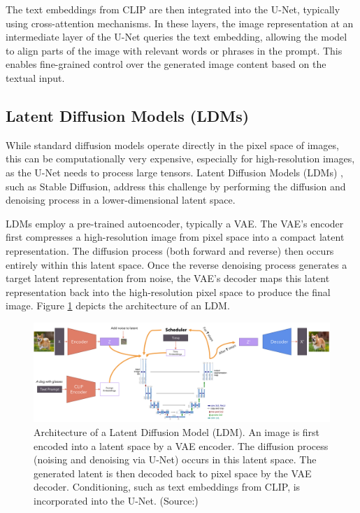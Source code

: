 The text embeddings from CLIP are then integrated into the U-Net, typically using cross-attention mechanisms. In these layers, the image representation at an intermediate layer of the U-Net queries the text embedding, allowing the model to align parts of the image with relevant words or phrases in the prompt. This enables fine-grained control over the generated image content based on the textual input.

\subsection{Latent Diffusion Models (LDMs)}\label{ssec:ldm}
While standard diffusion models operate directly in the pixel space of images, this can be computationally very expensive, especially for high-resolution images, as the U-Net needs to process large tensors. Latent Diffusion Models (LDMs) \cite{stablediffusion}, such as Stable Diffusion, address this challenge by performing the diffusion and denoising process in a lower-dimensional latent space.

LDMs employ a pre-trained autoencoder, typically a VAE. The VAE's encoder first compresses a high-resolution image from pixel space into a compact latent representation. The diffusion process (both forward and reverse) then occurs entirely within this latent space. Once the reverse denoising process generates a target latent representation from noise, the VAE's decoder maps this latent representation back into the high-resolution pixel space to produce the final image. Figure \ref{fig:ldm-architecture} depicts the architecture of an LDM.

\begin{figure}[h]
  \centering
  \includegraphics[width=\textwidth]{images/related-work/LDM-detailed.png}
  \caption{Architecture of a Latent Diffusion Model (LDM). An image is first encoded into a latent space by a VAE encoder. The diffusion process (noising and denoising via U-Net) occurs in this latent space. The generated latent is then decoded back to pixel space by the VAE decoder. Conditioning, such as text embeddings from CLIP, is incorporated into the U-Net. (Source:\cite{diffusion_process})}
  \label{fig:ldm-architecture}
\end{figure}

